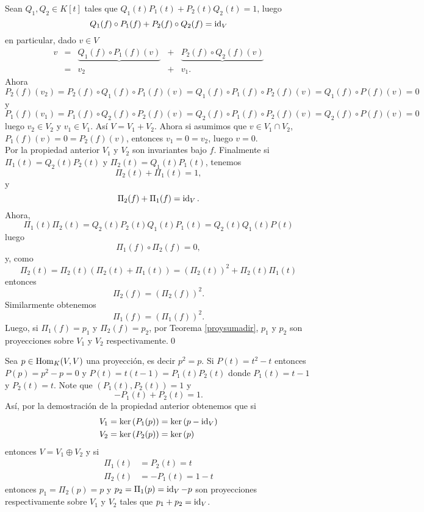 \dem Sean $Q_1,Q_2\in K[t]$ tales que $Q_1(t)P_1(t)+P_2(t)Q_2(t)=1$, luego
\[
Q_1(f)\circ P_1(f)+P_2(f)\circ Q_2(f)=\operatorname{id}_V
\]
en particular, dado $v\in V$
\[
\begin{array}{rcccc}
v & = & \underbrace{Q_1(f)\circ P_1(f)(v)} & + & \underbrace{P_2(f)\circ Q_2(f)(v)}\\
  & = & v_2 & + & v_1.
\end{array}
\]
Ahora
\[
P_2(f)(v_2)=P_2(f)\circ Q_1(f)\circ P_1(f)(v)=Q_1(f)\circ P_1(f)\circ P_2(f) (v)=Q_1(f)\circ P(f)(v)=0
\]
y
\[
P_1(f)(v_1)=P_1(f)\circ Q_2(f)\circ P_2(f)(v)=Q_2(f)\circ P_1(f)\circ P_2(f) (v)=Q_2(f)\circ P(f)(v)=0
\]
luego $v_2\in V_2$ y $v_1\in V_1$. As\'i $V=V_1+V_2$. Ahora si asumimos que $v\in V_1\cap V_2$, $P_1(f)(v)=0=P_2(f)(v)$, entonces $v_1=0=v_2$, luego $v=0$.\\
Por la propiedad anterior $V_1$ y $V_2$ son invariantes bajo $f$. Finalmente si $\Pi_1(t)=Q_2(t)P_2(t)$ y $\Pi_2(t)=Q_1(t)P_1(t)$, tenemos
\[
\Pi_2(t)+\Pi_1(t)=1,
\]
y
\[
\Pi_2(f)+\Pi_1(f)=\operatorname{id}_V.
\]
Ahora,
\[
\Pi_1(t)\Pi_2(t)=Q_2(t)P_2(t)Q_1(t)P_1(t)=Q_2(t)Q_1(t)P(t)
\]
luego
\[
\Pi_1(f)\circ\Pi_2(f)=0,
\]
y, como
\[
\Pi_2(t)=\Pi_2(t)\left(\Pi_2(t)+\Pi_1(t)\right)=\left(\Pi_2(t)\right)^2+\Pi_2(t)\Pi_1(t)
\]
entonces
\[
\Pi_2(f)=\left(\Pi_2(f)\right)^2.
\]
Similarmente obtenemos
\[
\Pi_1(f)=\left(\Pi_1(f)\right)^2.
\]
Luego, si $\Pi_1(f)=p_1$ y $\Pi_2(f)=p_2$, por Teorema \ref{proysumadir}, $p_1$ y $p_2$ son proyecciones sobre $V_1$ y $V_2$ respectivamente.\qed

\begin{ejem}
Sea $p\in\operatorname{Hom}_K(V,V)$ una proyecci\'on, es decir $p^2=p$. Si $P(t)=t^2-t$ entonces $P(p)=p^2-p=0$ y $P(t)=t(t-1)=P_1(t)P_2(t)$ donde $P_1(t)=t-1$ y $P_2(t)=t$. Note que $\left(P_1(t),P_2(t)\right)=1$ y $$-P_1(t)+P_2(t)=1.$$
As\'i, por la demostraci\'on de la propiedad anterior obtenemos que si \begin{align*}
V_1 & =\ker\left(P_1(p)\right)=\ker\left(p-\operatorname{id}_V\right)\\
V_2 & =\ker\left(P_2(p)\right)=\ker\left(p\right)
\end{align*}
entonces $V=V_1\oplus V_2$ y si
\begin{align*}
\Pi_1(t) & =P_2(t)=t\\
\Pi_2(t) & =-P_1(t)=1-t
\end{align*}
entonces $p_1=\Pi_2(p)=p$ y $p_2=\Pi_1(p)=\operatorname{id}_V-p$ son proyecciones respectivamente sobre $V_1$ y $V_2$ tales que $p_1+p_2=\operatorname{id}_V$.
\end{ejem}


